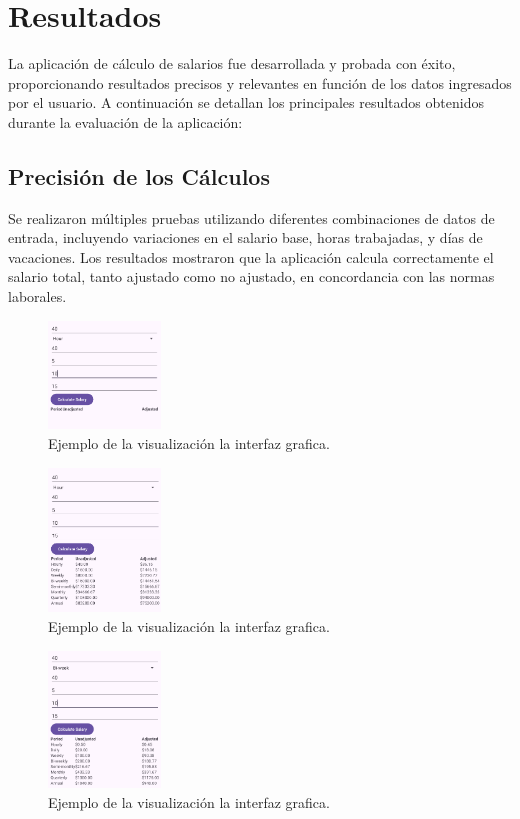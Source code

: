 \documentclass[conference]{IEEEtran}
\begin{document}
\section*{Resultados}

La aplicación de cálculo de salarios fue desarrollada y probada con éxito, proporcionando resultados precisos y relevantes en función de los datos ingresados por el usuario. A continuación se detallan los principales resultados obtenidos durante la evaluación de la aplicación:


\subsection*{Precisión de los Cálculos}
Se realizaron múltiples pruebas utilizando diferentes combinaciones de datos de entrada, incluyendo variaciones en el salario base, horas trabajadas, y días de vacaciones. Los resultados mostraron que la aplicación calcula correctamente el salario total, tanto ajustado como no ajustado, en concordancia con las normas laborales.


\begin{figure}[h]
\centering
\includegraphics[width=3cm]{1.png}
\caption{Ejemplo de la visualización la interfaz grafica.}
\label{fig:visualizacion_torque}
\end{figure}

\begin{figure}[h]
\centering
\includegraphics[width=3cm]{2.png}
\caption{Ejemplo de la visualización la interfaz grafica.}
\label{fig:visualizacion_torque}
\end{figure}

\begin{figure}[h]
\centering
\includegraphics[width=3cm]{3.png}
\caption{Ejemplo de la visualización la interfaz grafica.}
\label{fig:visualizacion_torque}
\end{figure}
\end{document}
